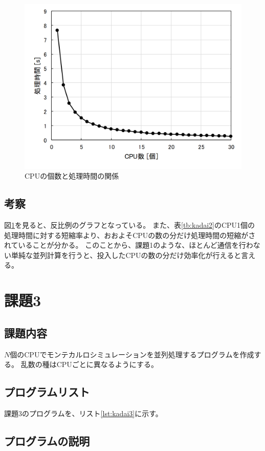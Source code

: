 \documentclass[a4j,titlepage]{jsarticle}
\begin{document}
\begin{figure}[H]
  \centering
  \includegraphics[width=12cm]{./MPI/kadai02-result/kadai02.png}
  \caption{CPUの個数と処理時間の関係}
  \label{fig:kadai2}
\end{figure}

\subsection{考察}
図\ref{fig:kadai2}を見ると、反比例のグラフとなっている。
また、表\ref{tb:kadai2}のCPU1個の処理時間に対する短縮率より、おおよそCPUの数の分だけ処理時間の短縮がされていることが分かる。
このことから、課題1のような、ほとんど通信を行わない単純な並列計算を行うと、投入したCPUの数の分だけ効率化が行えると言える。


\section{課題3}
\subsection{課題内容}
$N$個のCPUでモンテカルロシミュレーションを並列処理するプログラムを作成する。
乱数の種はCPUごとに異なるようにする。

\subsection{プログラムリスト}
課題3のプログラムを、リスト\ref{lst:kadai3}に示す。



\subsection{プログラムの説明}
\end{document}
